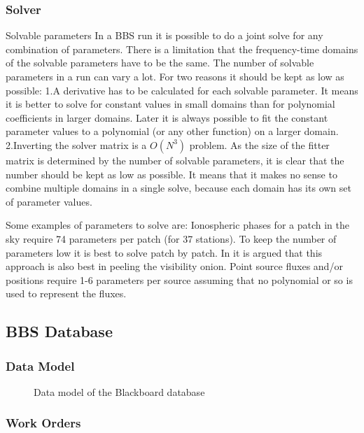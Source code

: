\documentclass[10pt]{lofar}
\begin{document}
\subsubsection{Solver}
\label{subsubsec:design-solver}
Solvable parameters
In a BBS run it is possible to do a joint solve for any combination of parameters. There is a limitation that the frequency-time domains of the solvable parameters have to be the same.
The number of solvable parameters in a run can vary a lot. For two reasons it should be kept as low as possible:
1.A derivative has to be calculated for each solvable parameter. It means it is better to solve for constant values in small domains than for polynomial coefficients in larger domains. Later it is always possible to fit the constant parameter values to a polynomial (or any other function) on a larger domain.
2.Inverting the solver matrix is a $O(N^3)$ problem. As the size of the fitter matrix is determined by the number of solvable parameters, it is clear that the number should be kept as low as possible.
It means that it makes no sense to combine multiple domains in a single solve, because each domain has its own set of parameter values.

Some examples of parameters to solve are:
Ionospheric phases for a patch in the sky require 74 parameters per patch (for 37 stations).
To keep the number of parameters low it is best to solve patch by patch. In  it is argued that this approach is also best in peeling the visibility onion.
Point source fluxes and/or positions require 1-6 parameters per source assuming that no polynomial or so is used to represent the fluxes.

\subsection{BBS Database}
\label{subsec:design-database}

\subsubsection{Data Model}
\label{subsubsec:design-data-model}
\begin{figure}
\caption{Data model of the Blackboard database}
\end{figure}

\subsubsection{Work Orders}
\label{subsubsec:design-work-orders}
\end{document}
